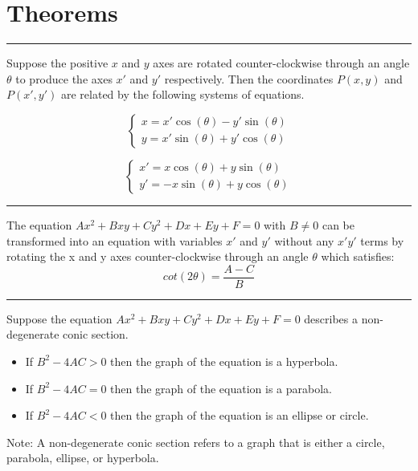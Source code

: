 \section{Theorems}
\hrule \medskip

\begin{theorem}
    Suppose the positive $x$ and $y$ axes are rotated counter-clockwise through an angle $\theta$ to produce the axes $x'$ and $y'$ respectively. Then the coordinates $P(x, y)$ and $P(x', y')$ are related by the following systems of equations. 
    
    \begin{equation*}
        \begin{cases}
            x = x'\cos(\theta) - y'\sin(\theta) \\
            y = x'\sin(\theta) + y'\cos(\theta)
        \end{cases}
    \end{equation*}
    
    \begin{equation*}
        \begin{cases}
            x' = x\cos(\theta) + y\sin(\theta) \\
            y' = -x\sin(\theta) + y\cos(\theta)
        \end{cases}
    \end{equation*}
\end{theorem}

\medskip \hrule \medskip

\begin{theorem}
    The equation $Ax^2 + Bxy + Cy^2 + Dx + Ey + F = 0$ with $B \neq 0$ can be transformed into an equation with variables $x'$ and $y'$ without any $x' y'$ terms by rotating the x and y axes counter-clockwise through an angle $\theta$ which satisfies:
    \[cot(2\theta) = \frac{A - C}{B}\]
\end{theorem}

\medskip \hrule \medskip

\begin{theorem}
    Suppose the equation $Ax^2 + Bxy + Cy^2 + Dx + Ey + F = 0$ describes a non-degenerate conic section. 
    
    \begin{itemize}
        \item If $B^2 - 4AC > 0$ then the graph of the equation is a hyperbola.
        \item If $B^2 - 4AC = 0$ then the graph of the equation is a parabola.
        \item If $B^2 - 4AC < 0$ then the graph of the equation is an ellipse or circle.
    \end{itemize}
    
    Note: A non-degenerate conic section refers to a graph that is either a circle, parabola, ellipse, or hyperbola. 
\end{theorem}